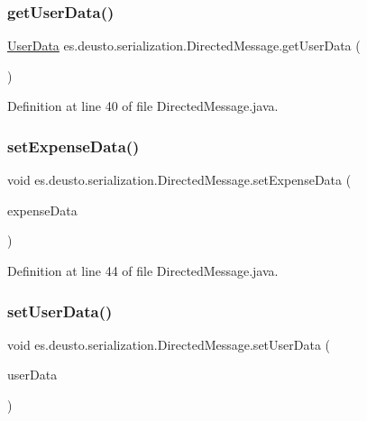 \subsubsection{\texorpdfstring{get\+User\+Data()}{getUserData()}}
{\footnotesize\ttfamily \hyperlink{classes_1_1deusto_1_1serialization_1_1_user_data}{User\+Data} es.\+deusto.\+serialization.\+Directed\+Message.\+get\+User\+Data (\begin{DoxyParamCaption}{ }\end{DoxyParamCaption})}



Definition at line 40 of file Directed\+Message.\+java.

\mbox{\label{classes_1_1deusto_1_1serialization_1_1_directed_message_a2f339d3849855fd1fc88cdf6a6c3e2cf}} 
\subsubsection{\texorpdfstring{set\+Expense\+Data()}{setExpenseData()}}
{\footnotesize\ttfamily void es.\+deusto.\+serialization.\+Directed\+Message.\+set\+Expense\+Data (\begin{DoxyParamCaption}\item[{\hyperlink{classes_1_1deusto_1_1serialization_1_1_expense_data}{Expense\+Data}}]{expense\+Data }\end{DoxyParamCaption})}



Definition at line 44 of file Directed\+Message.\+java.

\mbox{\label{classes_1_1deusto_1_1serialization_1_1_directed_message_a4a3f7852410bc29d73179294836e84c4}} 
\subsubsection{\texorpdfstring{set\+User\+Data()}{setUserData()}}
{\footnotesize\ttfamily void es.\+deusto.\+serialization.\+Directed\+Message.\+set\+User\+Data (\begin{DoxyParamCaption}\item[{\hyperlink{classes_1_1deusto_1_1serialization_1_1_user_data}{User\+Data}}]{user\+Data }\end{DoxyParamCaption})}

